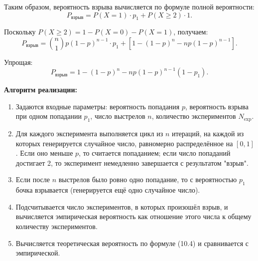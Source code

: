 \documentclass[a4paper]{article}
\theoremstyle{definition}
\begin{document}
Таким образом, вероятность взрыва вычисляется по формуле полной вероятности:
\begin{equation}
    P_{\text{взрыв}} = P(X = 1) \cdot p_1 + P(X \ge 2) \cdot 1. \tag{10.2}
\end{equation}

Поскольку $P(X \ge 2) = 1 - P(X = 0) - P(X = 1)$, получаем:
\begin{equation}
    P_{\text{взрыв}} = \binom{n}{1} p (1-p)^{n-1} \cdot p_1 + \left[1 - (1-p)^n - n p (1-p)^{n-1}\right]. \tag{10.3}
\end{equation}

Упрощая:
\begin{equation}
    P_{\text{взрыв}} = 1 - (1-p)^n - n p (1-p)^{n-1} (1 - p_1). \tag{10.4}
\end{equation}

\textbf{Алгоритм реализации:}

\begin{enumerate}
    \item Задаются входные параметры: вероятность попадания $p$, вероятность взрыва при одном попадании $p_1$, число выстрелов $n$, количество экспериментов $N_{\text{exp}}$.
    \item Для каждого эксперимента выполняется цикл из $n$ итераций, на каждой из которых генерируется случайное число, равномерно распределённое на $[0,1]$. Если оно меньше $p$, то считается попаданием; если число попаданий достигает 2, то эксперимент немедленно завершается с результатом "взрыв".
    \item Если после $n$ выстрелов было ровно одно попадание, то с вероятностью $p_1$ бочка взрывается (генерируется ещё одно случайное число).
    \item Подсчитывается число экспериментов, в которых произошёл взрыв, и вычисляется эмпирическая вероятность как отношение этого числа к общему количеству экспериментов.
    \item Вычисляется теоретическая вероятность по формуле (10.4) и сравнивается с эмпирической.
\end{enumerate}
\end{document}
